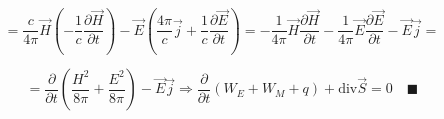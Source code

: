 \[
= \frac{c}{4\pi} \vec{H} \left( -\frac{1}{c}\frac{\partial\vec{H}}{\partial t}\right) -\vec{E}\left( \frac{4\pi}{c}\vec{j}+\frac{1}{c}\frac{\partial\vec{E}}{\partial t}    \right)   =-\frac{1}{4\pi}\vec{H}\frac{\partial\vec{H}}{\partial t}-\frac{1}{4\pi}\vec{E}\frac{\partial\vec{E}}{\partial t}-\vec{E}\vec{j}=    
\]

\[
=\frac{\partial}{\partial t}\left( \frac{H^2}{8\pi}+\frac{E^2}{8\pi}   \right) -\vec{E}\vec{j}\Rightarrow \frac{\partial}{\partial t} \left( W_E+W_M+q \right)+\mathrm{div}\vec{S}=0\quad \blacksquare 
\]
